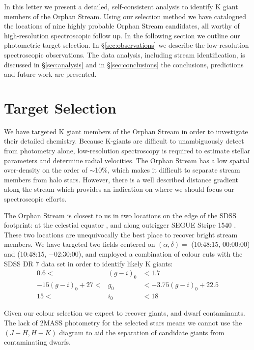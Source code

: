 \documentclass[10pt,apjl]{emulateapj}
\begin{document}
In this letter we present a detailed, self-consistent analysis to identify K giant members of the Orphan Stream. Using our selection method we have catalogued the locations of nine highly probable Orphan Stream candidates, all worthy of high-resolution spectroscopic follow up. In the following section we outline our photometric target selection. In \S\ref{sec:observations} we describe the low-resolution spectroscopic observations. The data analysis, including stream identification, is discussed in \S\ref{sec:analysis} and in \S\ref{sec:conclusions} the conclusions, predictions and future work are presented.


\section{Target Selection}
\label{sec:target-selection}

We have targeted K giant members of the Orphan Stream in order to investigate their detailed chemistry. Because K-giants are difficult to unambiguously detect from photometry alone, low-resolution spectroscopy is required to estimate stellar parameters and determine radial velocities. The Orphan Stream has a low spatial over-density on the order of $\sim$10\%, which makes it difficult to separate stream members from halo stars. However, there is a well described distance gradient along the stream \citep{Belokurov_et-al_2007, Newberg_et-al_2010} which provides an indication on where we should focus our spectroscopic efforts.

The Orphan Stream is closest to us in two locations on the edge of the SDSS footprint: at the celestial equator \citep{Belokurov_et-al_2007}, and along outrigger SEGUE Stripe 1540 \citep{Newberg_et-al_2010}. These two locations are unequivocally the best place to recover bright stream members. We have targeted two fields centered on $(\alpha, \delta) =$ (10:48:15, 00:00:00) and (10:48:15, $-$02:30:00), and employed a combination of colour cuts with the SDSS DR 7 \citep{Abazajian_et-al_2009} data set in order to identify likely K giants:
\begin{eqnarray}
0.6 <& (g-i)_0 &< 1.7 \\
-15(g-i)_0 + 27 <& g_0 &< -3.75(g-i)_0 + 22.5 \\
15  <& i_0  &< 18 
\end{eqnarray}

Given our colour selection we expect to recover giants, and dwarf contaminants. The lack of 2MASS photometry for the selected stars means we cannot use the $(J-H, H-K)$ diagram to aid the separation of candidate giants from contaminating dwarfs.
\end{document}
